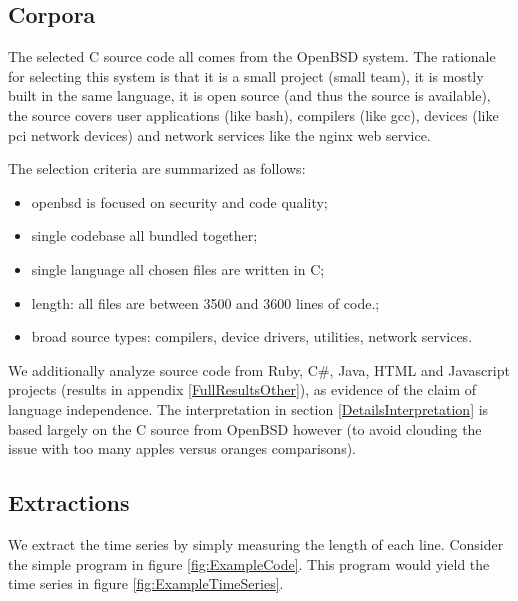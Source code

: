 \documentclass[12pt]{article}
\begin{document}
\subsection{Corpora}\label{DetailsCorpora}

The selected C source code all comes from the OpenBSD system.  The rationale for selecting this system is that it is a small project (small team), it is mostly built in the same language, it is open source (and thus the source is available), the source covers user applications (like bash), compilers (like gcc), devices (like pci network devices) and network services like the nginx web service.

The selection criteria are summarized as follows:
\begin{itemize}
\item openbsd is focused on security and code quality;
\item single codebase all bundled together;
\item single language all chosen files are written in C;
\item length: all files are between 3500 and 3600 lines of code.;
\item broad source types: compilers, device drivers, utilities, network services.
\end{itemize}

We additionally analyze source code from Ruby, C\#, Java, HTML and Javascript projects (results in appendix \ref{FullResultsOther}), as evidence of the claim of language independence.  The interpretation in section \ref{DetailsInterpretation} is based largely on the C source from OpenBSD however (to avoid clouding the issue with too many apples versus oranges comparisons).

\subsection{Extractions}\label{DetailsExtractions}
We extract the time series by simply measuring the length of each line.  Consider the simple program in figure \ref{fig:ExampleCode}.  This program would yield the time series in figure \ref{fig:ExampleTimeSeries}.
\end{document}
